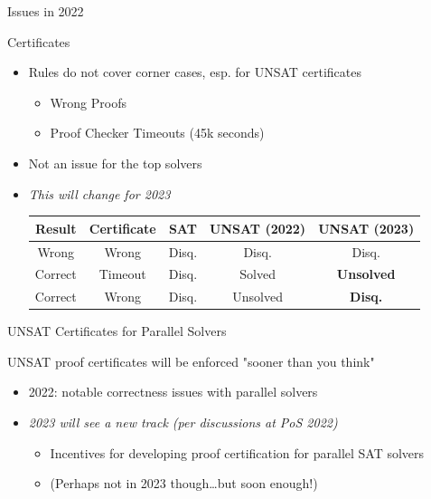 \documentclass{beamer}
\begin{document}
\begin{frame}{Issues in 2022}
\begin{block}{Certificates}
\centering

\begin{itemize}\setlength\itemsep{1em}
	\item Rules do not cover corner cases, esp. for UNSAT certificates
	\begin{itemize}
		\item Wrong Proofs
		\item Proof Checker Timeouts (45k seconds)
	\end{itemize}
	\item Not an issue for the top solvers
	\item \emph{This will change for 2023}\\[1em]
\begin{tabular}{cc|ccc}
Result & Certificate & SAT & UNSAT (2022) & UNSAT (2023) \\
\hline
Wrong & Wrong & Disq. & Disq. & Disq. \\
Correct & Timeout & Disq. & Solved & \bf Unsolved \\
Correct & Wrong & Disq. & Unsolved & \bf Disq. \\
\end{tabular}
\end{itemize}
\end{block}
\end{frame}

\begin{frame}{UNSAT Certificates for Parallel Solvers}
\begin{block}{UNSAT proof certificates will be enforced "sooner than you think"}
	\begin{itemize}\setlength\itemsep{1em}
		\item 2022: notable correctness issues with parallel solvers
		\item \emph{2023 will see a new track (per discussions at PoS 2022)}\\[.5em]
		\begin{itemize}\setlength\itemsep{1em}
			\item Incentives for developing proof certification for parallel SAT solvers
			\item (Perhaps not in 2023 though\dots but soon enough!)
		\end{itemize}
	\end{itemize}
\end{block}
\end{frame}
\end{document}
